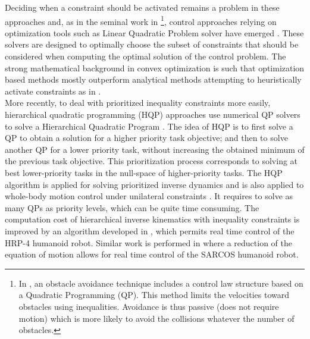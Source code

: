\documentclass[12pt,a4paper,twoside]{article}
\begin{document}
Deciding when a constraint should be activated remains a problem in these approaches \cite{Rubrecht2011b} and, as in the seminal work in \cite{Faverjon1987}\footnote{In \cite{Faverjon1987}, an obstacle avoidance technique includes a control law structure based on a Quadratic Programming (QP). This method limits the velocities toward obstacles using inequalities.  Avoidance is thus passive (does not require motion) which is more likely to avoid the collisions whatever the number of obstacles.}, control approaches relying on optimization tools such as Linear Quadratic Problem solver have emerged \cite{Abe07,Collette07}. These solvers are designed to optimally choose the subset of constraints that should be considered when computing the optimal solution of the control problem. The strong mathematical background in convex optimization is such that optimization based methods mostly outperform analytical methods attempting to heuristically activate constraints as in \cite{Flacco12, Flacco12bis}.\\

More recently, to deal with prioritized inequality constraints more easily, hierarchical quadratic programming (HQP) approaches use numerical QP solvers to solve a Hierarchical Quadratic Program \cite{Kanoun09}. 
The idea of HQP is to first solve a QP to obtain a solution for a higher priority task objective; 
and then to solve another QP for a lower priority task, without increasing the obtained minimum of the previous task objective. This prioritization process corresponds to solving at best lower-priority tasks in the null-space of higher-priority tasks.
The HQP algorithm is applied for solving prioritized inverse dynamics \cite{Saab11} and is also applied to whole-body motion control under unilateral constraints \cite{Saab13}.
It requires to solve as many QPs as priority levels, which can be quite time consuming. The computation cost of hierarchical inverse kinematics with inequality constraints is improved by an algorithm developed in \cite{Escande14}, which permits real time control of the HRP-4 humanoid robot. Similar work is performed in \cite{HerzogIROS2014} where a reduction of the equation of motion allows for real time control of the SARCOS humanoid robot.\\ 
\end{document}
